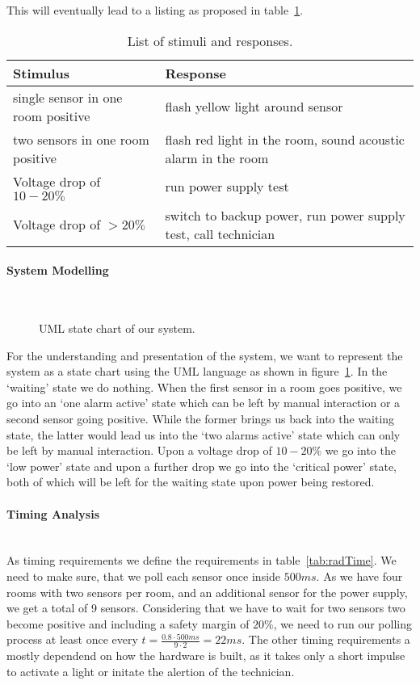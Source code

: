 \documentclass[10pt,a4paper,titlepage,draft]{scrartcl} %
\begin{document}
This will eventually lead to a listing as proposed in table~\ref{tab:radWarner}.
\begin{table}[htbp]
\begin{tabular}{|p{4cm}|p{7.2cm}|}
\hline %
\rowcolor{gray} Stimulus & Response \\
\hline %
single sensor in one room positive & flash yellow light around sensor \\
\hline %
two sensors in one room positive & flash red light in the room, sound acoustic alarm in the room\\
\hline %
Voltage drop of $10-20\%$ & run power supply test\\
\hline %
Voltage drop of $>20\%$ & switch to backup power, run power supply test, call technician\\
\hline %
\end{tabular}
\caption{List of stimuli and responses.}
\label{tab:radWarner}
\end{table}

\paragraph{System Modelling}  \ \\
\begin{figure}[htbp]
\centering
\scalebox{.7}{}
\caption{UML state chart of our system.}
\label{fig:radState}
\end{figure}
For the understanding and presentation of the system, we want to represent the system as a state chart using the UML language as shown in figure~\ref{fig:radState}.
In the `waiting' state we do nothing.
When the first sensor in a room goes positive, we go into an `one alarm active' state which can be left by manual interaction or a second sensor going positive.
While the former brings us back into the waiting state, the latter would lead us into the `two alarms active' state which can only be left by manual interaction.
Upon a voltage drop of $10-20\%$ we go into the `low power' state and upon a further drop we go into the `critical power' state, both of which will be left for the waiting state upon power being restored.

\paragraph{Timing Analysis} \ \\
As timing requirements we define the requirements in table~\ref{tab:radTime}.
We need to make sure, that we poll each sensor once inside $500ms$.
As we have four rooms with two sensors per room, and an additional sensor for the power supply, we get a total of 9 sensors.
Considering that we have to wait for two sensors two become positive and including a safety margin of $20\%$, we need to run our polling process at least once every $\displaystyle t=\frac{0.8\cdot500ms}{9\cdot2}=22ms$. The other timing requirements a mostly dependend on how the hardware is built, as it takes only a short impulse to activate a light or initate the alertion of the technician.
\end{document}
